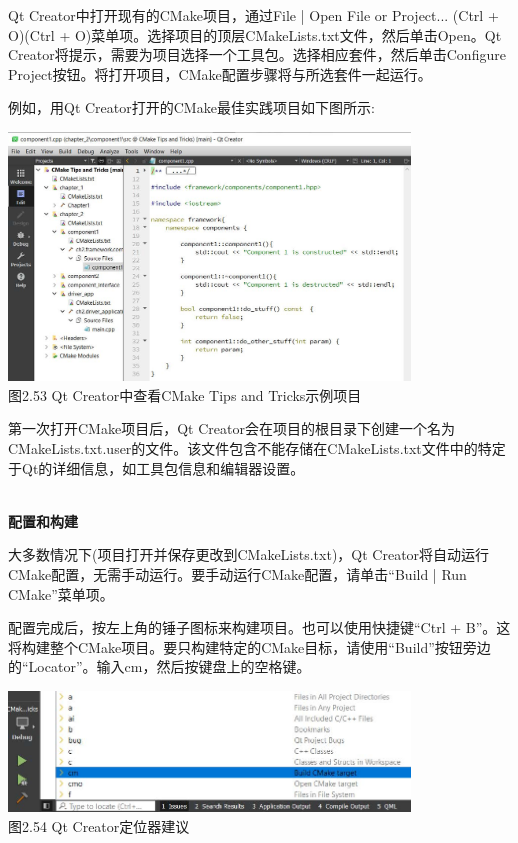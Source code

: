 Qt Creator中打开现有的CMake项目，通过File | Open File or Project... (Ctrl + O)(Ctrl + O)菜单项。选择项目的顶层CMakeLists.txt文件，然后单击Open。Qt Creator将提示，需要为项目选择一个工具包。选择相应套件，然后单击Configure Project按钮。将打开项目，CMake配置步骤将与所选套件一起运行。

例如，用Qt Creator打开的CMake最佳实践项目如下图所示:

\begin{center}
\includegraphics[width=0.8\textwidth]{content/1/chapter2/images/53.jpg}\\
图2.53 Qt Creator中查看CMake Tips and Tricks示例项目
\end{center}

第一次打开CMake项目后，Qt Creator会在项目的根目录下创建一个名为CMakeLists.txt.user的文件。该文件包含不能存储在CMakeLists.txt文件中的特定于Qt的详细信息，如工具包信息和编辑器设置。

\hspace*{\fill} \\ %
\noindent
\textbf{配置和构建}

大多数情况下(项目打开并保存更改到CMakeLists.txt)，Qt Creator将自动运行CMake配置，无需手动运行。要手动运行CMake配置，请单击“Build | Run CMake”菜单项。

配置完成后，按左上角的锤子图标来构建项目。也可以使用快捷键“Ctrl + B”。这将构建整个CMake项目。要只构建特定的CMake目标，请使用“Build”按钮旁边的“Locator”。输入cm，然后按键盘上的空格键。

\begin{center}
\includegraphics[width=0.8\textwidth]{content/1/chapter2/images/54.jpg}\\
图2.54 Qt Creator定位器建议
\end{center}


